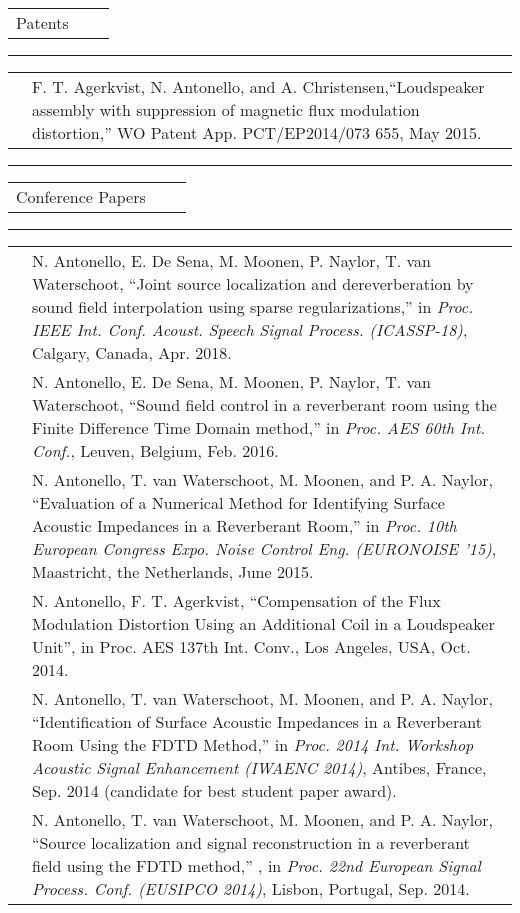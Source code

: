 \documentclass[10pt,A4]{article}
\newcommand{\tzlarrow}{(0,0) -- (0.2,0) -- (0.3,0.2) -- (0.2,0.4) -- (0,0.4) -- (0.1,0.2) -- cycle;}
\newcommand{\larrow}[1]
{\begin{tikzpicture}[scale=0.58]
	 \filldraw[fill=#1!100,draw=#1!100!black]  \tzlarrow
 \end{tikzpicture}
}
\newcommand{\cveventsingle}[4]
{
\vspace{8pt}
	\begin{tabular*}{1\textwidth}{p{5.3cm}  p{4.8cm} x{6.9cm}}
 \textcolor{bgcol}{#1}& \textbf{#2} & \vspace{2.5pt}\textcolor{sectcol}{#3}

	\end{tabular*}
\vspace{-12pt}
\textcolor{softcol}{\hrule}
\vspace{6pt}
	\begin{tabular*}{1\textwidth}{p{0.3cm} p{16.4cm}}
&		 \larrow{bgcol}  #4\\[3pt]
	\end{tabular*}

}
\newcommand{\cveventnone}[3]
{
\vspace{8pt}
	\begin{tabular*}{1\textwidth}{p{5.3cm}  p{4.8cm} x{6.9cm}}
 \textcolor{bgcol}{#1}& \textbf{#2} & \vspace{2.5pt}\textcolor{sectcol}{#3}

	\end{tabular*}
	\vspace{-12pt}
\textcolor{softcol}{\hrule}
}
\begin{document}
\cveventsingle{Patents}{}{ }{
{F. T. Agerkvist, N. Antonello, and A. Christensen},``Loudspeaker assembly with suppression of magnetic flux modulation distortion,'' WO Patent App. PCT/EP2014/073 655, May 2015.
}

\newpage
\textcolor{softcol}{\hrule}
\cveventnone{Conference Papers}{}{ }
\vspace{6pt}

	\begin{tabular*}{1\textwidth}{p{0.3cm} p{16.4cm}}
& \larrow{bgcol}
N. Antonello, E. De Sena, M. Moonen, P. Naylor, T. van Waterschoot, ``Joint source localization and dereverberation by sound field interpolation using sparse regularizations,''  in {\em Proc. IEEE Int. Conf. Acoust. Speech Signal Process. (ICASSP-18)}, Calgary, Canada, Apr. 2018.
\\[6pt]


& \larrow{bgcol}
N. Antonello, E. De Sena, M. Moonen, P. Naylor, T. van Waterschoot, ``Sound field control in a reverberant room using the Finite Difference Time Domain method,'' in {\em Proc. AES 60th Int. Conf.}, Leuven, Belgium, Feb. 2016.
\\[6pt]

& \larrow{bgcol}
{N. Antonello, T. van Waterschoot, M. Moonen, and P. A. Naylor}, {``Evaluation of a Numerical Method for Identifying Surface Acoustic Impedances in a Reverberant Room,''} in {\em Proc. 10th European Congress Expo. Noise Control Eng. (EURONOISE '15)}, Maastricht, the Netherlands, June 2015.
\\[3pt]

& \larrow{bgcol}
N. Antonello, F. T. Agerkvist, ``Compensation of the Flux Modulation Distortion Using an Additional Coil in a Loudspeaker Unit'', in Proc. AES 137th Int. Conv., Los Angeles, USA, Oct. 2014.
\\[3pt]

& \larrow{bgcol}
{N. Antonello, T. van Waterschoot, M. Moonen, and P. A. Naylor},{ ``Identification of Surface Acoustic Impedances in a Reverberant Room Using the FDTD Method,''} in {\em Proc. 2014 Int. Workshop Acoustic Signal Enhancement (IWAENC 2014)}, Antibes, France, Sep. 2014 (candidate for best student paper award).
\\[3pt]


& \larrow{bgcol}
{N. Antonello, T. van Waterschoot, M. Moonen, and P. A. Naylor},{ ``Source localization and signal reconstruction in a reverberant field using the FDTD method,''} , in {\em Proc. 22nd European Signal Process. Conf. (EUSIPCO 2014)}, Lisbon, Portugal, Sep. 2014.
\\[3pt]

	\end{tabular*}
\end{document}
